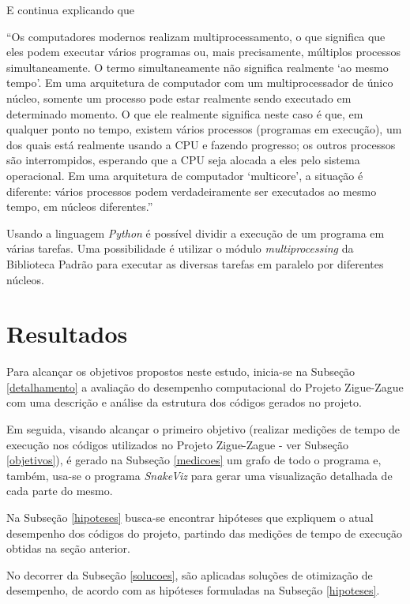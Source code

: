 \documentclass[12pt]{article}
\newcommand{\aspas}[1]{``#1''} %
\newcommand{\citacao}[1]{
	\singlespacing %
	\begin{flushright}
		\begin{minipage}{0.75\linewidth} %
			{\fontsize{10}{\baselineskip}\selectfont \aspas{#1}}
		\end{minipage}
	\end{flushright}
	\onehalfspacing %
}
\begin{document}
\noindent E continua explicando que 

\citacao{Os computadores modernos realizam multiprocessamento, o que significa que eles podem executar vários
	programas ou, mais precisamente, múltiplos processos simultaneamente. O termo simultaneamente não significa realmente `ao mesmo tempo'. Em uma arquitetura de computador com um multiprocessador de único núcleo, somente
	um processo pode estar realmente sendo executado em determinado momento. O que ele realmente significa neste
	caso é que, em qualquer ponto no tempo, existem vários processos (programas em execução), um dos quais está
	realmente usando a CPU e fazendo progresso; os outros processos são interrompidos, esperando que a CPU seja
	alocada a eles pelo sistema operacional. Em uma arquitetura de computador `multicore', a situação é diferente: vários
	processos podem verdadeiramente ser executados ao mesmo tempo, em núcleos diferentes.}

Usando a linguagem \textit{Python} é possível dividir a execução de um programa em várias tarefas. Uma possibilidade é utilizar o módulo \textit{multiprocessing} da Biblioteca Padrão para executar as diversas tarefas em paralelo por diferentes núcleos.


\section{Resultados}

Para alcançar os objetivos propostos neste estudo, inicia-se na Subseção \ref{detalhamento} a avaliação do desempenho computacional do Projeto Zigue-Zague com uma descrição e análise da estrutura dos códigos gerados no projeto.

Em seguida, visando alcançar o primeiro objetivo (realizar medições de tempo de execução nos códigos utilizados no Projeto Zigue-Zague - ver Subseção \ref{objetivos}), é gerado na Subseção \ref{medicoes} um grafo de todo o programa e, também, usa-se o programa \textit{SnakeViz} para gerar uma visualização detalhada de cada parte do mesmo.

Na Subseção \ref{hipoteses} busca-se encontrar hipóteses que expliquem o atual desempenho dos códigos do projeto, partindo das medições de tempo de execução obtidas na seção anterior.

No decorrer da Subseção \ref{solucoes}, são aplicadas soluções de otimização de desempenho, de acordo com as hipóteses formuladas na Subseção \ref{hipoteses}.
\end{document}
